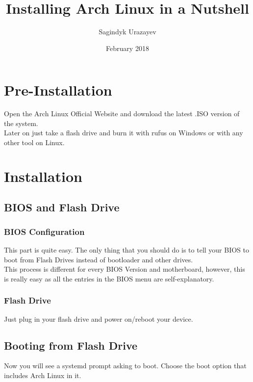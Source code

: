 \documentclass{article}
\title{Installing Arch Linux in a Nutshell}
\date{February 2018}
\author{Sagindyk Urazayev}
\begin{document}
\maketitle
\newpage
\tableofcontents
\newpage
\section{Pre-Installation}

Open the Arch Linux Official Website and download the latest .ISO version of the system.\\

Later on just take a flash drive and burn it with rufus on Windows or with any other tool on Linux. \\

\section{Installation}

\subsection{BIOS and Flash Drive}

\subsubsection{BIOS Configuration}

This part is quite easy. The only thing that you should do is to tell your BIOS to boot from Flash Drives instead of bootloader and other drives.\\
This process is different for every BIOS Version and motherboard, however, this is really easy as all the entries in the BIOS menu are self-explanatory.\\

\subsubsection{Flash Drive}

Just plug in your flash drive and power on/reboot your device.\\

\subsection{Booting from Flash Drive}

Now you will see a systemd prompt asking to boot. Choose the boot option that includes Arch Linux in it.\\
\end{document}

